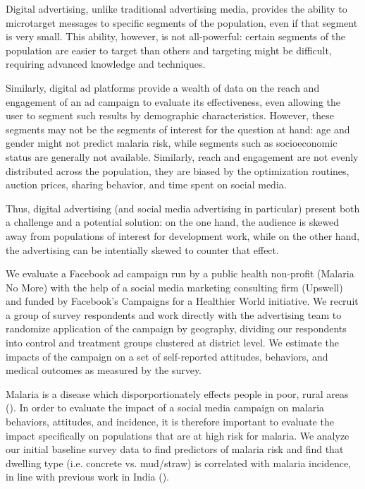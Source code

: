 \documentclass[a4paper,12pt]{article}
\theoremstyle{proposition}
\begin{document}
Digital advertising, unlike traditional advertising media, provides the ability to microtarget messages to specific segments of the population, even if that segment is very small. This ability, however, is not all-powerful: certain segments of the population are easier to target than others and targeting might be difficult, requiring advanced knowledge and techniques.

Similarly, digital ad platforms provide a wealth of data on the reach and engagement of an ad campaign to evaluate its effectiveness, even allowing the user to segment such results by demographic characteristics. However, these segments may not be the segments of interest for the question at hand: age and gender might not predict malaria risk, while segments such as socioeconomic status are generally not available. Similarly, reach and engagement are not evenly distributed across the population, they are biased by the optimization routines, auction prices, sharing behavior, and time spent on social media.

Thus, digital advertising (and social media advertising in particular) present both a challenge and a potential solution: on the one hand, the audience is skewed away from populations of interest for development work, while on the other hand, the advertising can be intentially skewed to counter that effect.

We evaluate a Facebook ad campaign run by a public health non-profit (Malaria No More) with the help of a social media marketing consulting firm (Upswell) and funded by Facebook's Campaigns for a Healthier World initiative. We recruit a group of survey respondents and work directly with the advertising team to randomize application of the campaign by geography, dividing our respondents into control and treatment groups clustered at district level. We estimate the impacts of the campaign on a set of self-reported attitudes, behaviors, and medical outcomes as measured by the survey.

Malaria is a disease which disporportionately effects people in poor, rural areas (\cite{ref}). In order to evaluate the impact of a social media campaign on malaria behaviors, attitudes, and incidence, it is therefore important to evaluate the impact specifically on populations that are at high risk for malaria. We analyze our initial baseline survey data to find predictors of malaria risk and find that dwelling type (i.e. concrete vs. mud/straw) is correlated with malaria incidence, in line with previous work in India (\cite{ref}).
\end{document}
